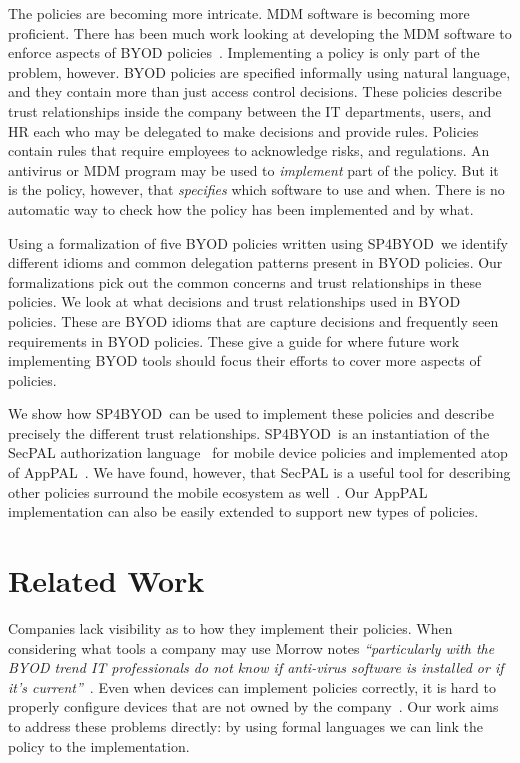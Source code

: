 \documentclass{llncs}
\newcommand{\AppPAL}[0]{SP4BYOD}
\begin{document}
The policies are becoming more intricate.
\ac{MDM} software is becoming more proficient.
There has been much work looking at developing the \ac{MDM} software to enforce aspects of BYOD policies~\cite{costantino_towards_2013,martinelli_enhancing_2016,armando_enabling_2014}.
Implementing a policy is only part of the problem, however.
BYOD policies are specified informally using natural language, and they contain more than just access control decisions.
These policies describe trust relationships inside the company between the IT departments, users, and HR each who may be delegated to make decisions and provide rules.
Policies contain rules that require employees to acknowledge risks, and regulations.
An antivirus or \ac{MDM} program may be used to \emph{implement} part of the policy.
But it is the policy, however, that \emph{specifies} which software to use and when. 
There is no automatic way to check how the policy has been implemented and by what.

Using a formalization of five BYOD policies written using \AppPAL~we identify different idioms and common delegation patterns present in BYOD policies.
Our formalizations pick out the common concerns and trust relationships in these policies.
We look at what decisions and trust relationships used in BYOD policies.
These are BYOD idioms that are capture decisions and frequently seen requirements in BYOD policies.
These give a guide for where future work implementing BYOD tools should focus their efforts to cover more aspects of policies.

We show how \AppPAL~can be used to implement these policies and describe precisely the different trust relationships.
\AppPAL~is an instantiation of the SecPAL authorization language~\cite{becker_secpal:_2010} for mobile device policies and implemented atop of AppPAL~\cite{hallett_apppal_2016}.
We have found, however, that SecPAL is a useful tool for describing other policies surround the mobile ecosystem as well~\cite{hallett_specifying_2016}.
Our AppPAL implementation can also be easily extended to support new types of policies.

\section{Related Work}
\label{sec:related}

Companies lack visibility as to how they implement their policies.
When considering what tools a company may use Morrow notes \emph{``particularly with the BYOD trend IT professionals do not know if anti-virus software is installed or if it's current''}~\cite{morrow_byod_2012}.
Even when devices can implement policies correctly, it is hard to properly configure devices that are not owned by the company~\cite{tokuyoshi_security_2013}.
Our work aims to address these problems directly: by using formal languages we can link the policy to the implementation.
\end{document}
